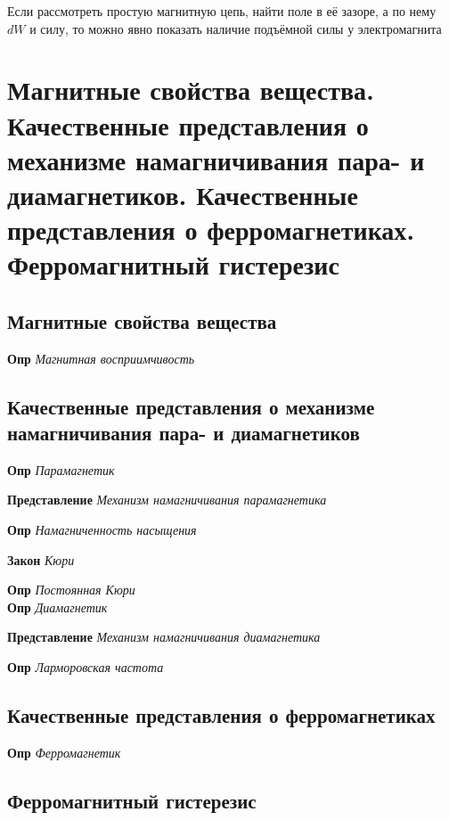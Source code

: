 \documentclass[a4paper, 14pt]{article}
\begin{document}
    Если рассмотреть простую магнитную цепь, найти поле в её зазоре, а по нему $dW$ и силу, то можно явно показать
    наличие подъёмной силы у электромагнита
    
    \section{Магнитные свойства вещества.
    Качественные представления о механизме намагничивания пара- и диамагнетиков.
    Качественные представления о ферромагнетиках.
    Ферромагнитный гистерезис}
    
    \subsection{Магнитные свойства вещества}
    
    \textbf{Опр} \textit{Магнитная восприимчивость}
    
    \subsection{Качественные представления о механизме намагничивания пара- и диамагнетиков}
    
    \textbf{Опр} \textit{Парамагнетик}
    
    \textbf{Представление} \textit{Механизм намагничивания парамагнетика}
    
    \textbf{Опр} \textit{Намагниченность насыщения}
    
    \textbf{Закон} \textit{Кюри}
    
    \textbf{Опр} \textit{Постоянная Кюри} \\
    
    \textbf{Опр} \textit{Диамагнетик}
    
    \textbf{Представление} \textit{Механизм намагничивания диамагнетика}
    
    \textbf{Опр} \textit{Ларморовская частота}
    
    \subsection{Качественные представления о ферромагнетиках}
    
    \textbf{Опр} \textit{Ферромагнетик}
    
    \subsection{Ферромагнитный гистерезис}
    
\end{document}
